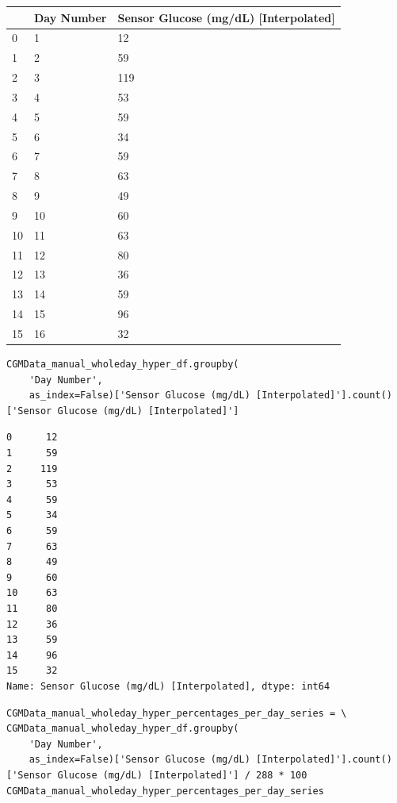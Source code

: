 \bigskip\noindent
\begin{tabular}{p{}p{}p{}}
\toprule
 & Day Number & Sensor Glucose (mg/dL) [Interpolated] \\
\hline
0 & 1 & 12 \\
\hline
1 & 2 & 59 \\
\hline
2 & 3 & 119 \\
\hline
3 & 4 & 53 \\
\hline
4 & 5 & 59 \\
\hline
5 & 6 & 34 \\
\hline
6 & 7 & 59 \\
\hline
7 & 8 & 63 \\
\hline
8 & 9 & 49 \\
\hline
9 & 10 & 60 \\
\hline
10 & 11 & 63 \\
\hline
11 & 12 & 80 \\
\hline
12 & 13 & 36 \\
\hline
13 & 14 & 59 \\
\hline
14 & 15 & 96 \\
\hline
15 & 16 & 32 \\
\hline
\bottomrule
\end{tabular}

\bigskip

\begin{verbatim}
CGMData_manual_wholeday_hyper_df.groupby(
    'Day Number',
    as_index=False)['Sensor Glucose (mg/dL) [Interpolated]'].count()['Sensor Glucose (mg/dL) [Interpolated]']
\end{verbatim}

\begin{verbatim}
0      12
1      59
2     119
3      53
4      59
5      34
6      59
7      63
8      49
9      60
10     63
11     80
12     36
13     59
14     96
15     32
Name: Sensor Glucose (mg/dL) [Interpolated], dtype: int64
\end{verbatim}

\begin{verbatim}
CGMData_manual_wholeday_hyper_percentages_per_day_series = \
CGMData_manual_wholeday_hyper_df.groupby(
    'Day Number',
    as_index=False)['Sensor Glucose (mg/dL) [Interpolated]'].count()['Sensor Glucose (mg/dL) [Interpolated]'] / 288 * 100
CGMData_manual_wholeday_hyper_percentages_per_day_series
\end{verbatim}

